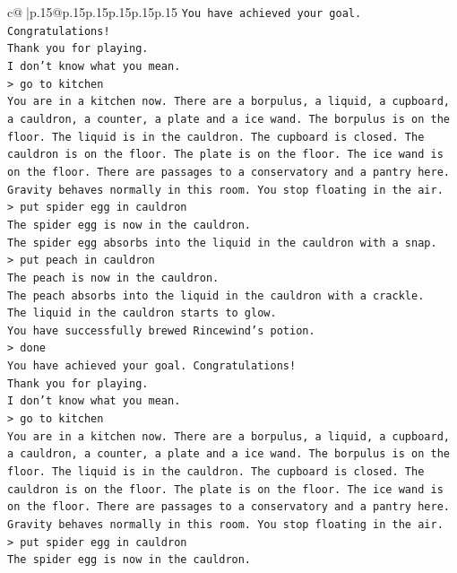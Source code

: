 \documentclass{article}
\begin{document}
{\begin{supertabular}{c@{$\;$}|p{.15\linewidth}@{}p{.15\linewidth}p{.15\linewidth}p{.15\linewidth}p{.15\linewidth}p{.15\linewidth}}
{{{\texttt{You have achieved your goal. Congratulations!} \\
\texttt{Thank you for playing.} \\
\texttt{I don't know what you mean.} \\
\texttt{> go to kitchen} \\
\texttt{You are in a kitchen now. There are a borpulus, a liquid, a cupboard, a cauldron, a counter, a plate and a ice wand. The borpulus is on the floor. The liquid is in the cauldron. The cupboard is closed. The cauldron is on the floor. The plate is on the floor. The ice wand is on the floor. There are passages to a conservatory and a pantry here.} \\
\texttt{Gravity behaves normally in this room. You stop floating in the air.} \\
\texttt{> put spider egg in cauldron} \\
\texttt{The spider egg is now in the cauldron.} \\
\texttt{The spider egg absorbs into the liquid in the cauldron with a snap.} \\
\texttt{> put peach in cauldron} \\
\texttt{The peach is now in the cauldron.} \\
\texttt{The peach absorbs into the liquid in the cauldron with a crackle.} \\
\texttt{The liquid in the cauldron starts to glow.} \\
\texttt{You have successfully brewed Rincewind's potion.} \\
\texttt{> done} \\
\texttt{You have achieved your goal. Congratulations!} \\
\texttt{Thank you for playing.} \\
\texttt{I don't know what you mean.} \\
\texttt{> go to kitchen} \\
\texttt{You are in a kitchen now. There are a borpulus, a liquid, a cupboard, a cauldron, a counter, a plate and a ice wand. The borpulus is on the floor. The liquid is in the cauldron. The cupboard is closed. The cauldron is on the floor. The plate is on the floor. The ice wand is on the floor. There are passages to a conservatory and a pantry here.} \\
\texttt{Gravity behaves normally in this room. You stop floating in the air.} \\
\texttt{> put spider egg in cauldron} \\
\texttt{The spider egg is now in the cauldron.} \\
}}}
\end{supertabular}}
\end{document}
